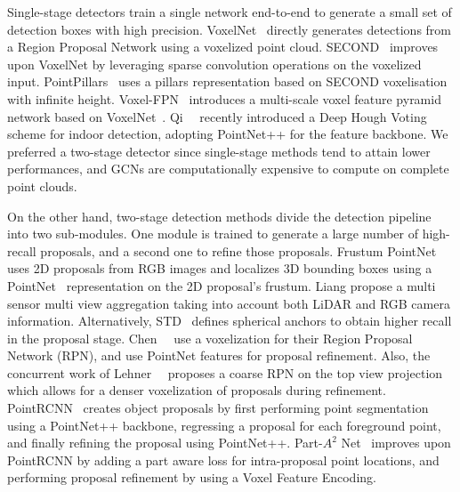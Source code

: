 \documentclass[10pt,twocolumn,letterpaper]{article}
\begin{document}
Single-stage detectors train a single network end-to-end to generate a small set of detection boxes with high precision.
VoxelNet~\cite{zhou2018voxelnet} directly generates detections from a Region Proposal Network using a voxelized point cloud.
SECOND~\cite{yan2018second} improves upon VoxelNet by leveraging sparse convolution operations on the voxelized input.
PointPillars~\cite{lang2019pointpillars} uses a pillars representation based on SECOND voxelisation with infinite height.
Voxel-FPN~\cite{wang2019voxel} introduces a multi-scale voxel feature pyramid network based on VoxelNet~\cite{zhou2018voxelnet}. 
Qi~\etal~\cite{Qi_2019_ICCV} recently introduced a Deep Hough Voting scheme for indoor detection, adopting PointNet++\cite{qi2017pointnet++} for the feature backbone.
We preferred a two-stage detector since single-stage methods tend to attain lower performances, and GCNs are computationally expensive to compute on complete point clouds.






On the other hand, two-stage detection methods divide the detection pipeline into two sub-modules.
One module is trained to generate a large number of high-recall proposals, and a second one to refine those proposals.
Frustum PointNet~\cite{qi2018frustum} uses 2D proposals from RGB images and localizes 3D bounding boxes using a PointNet~\cite{qi2017pointnet} representation on the 2D proposal's frustum.
Liang \cite{liang2019multi} propose a multi sensor multi view aggregation taking into account both LiDAR and RGB camera information.
Alternatively, STD~\cite{Yang2019std} defines spherical anchors to obtain higher recall in the proposal stage.
Chen~\etal~\cite{Chen2019FastPointRCNN} use a voxelization for their Region Proposal Network (RPN), and use PointNet features for proposal refinement.
Also, the concurrent work of Lehner~\etal~\cite{lehner2019patch} proposes a coarse RPN on the top view projection which allows for a denser voxelization of proposals during refinement.
PointRCNN~\cite{shi2019pointrcnn} creates object proposals by first performing point segmentation using a PointNet++ backbone, regressing a proposal for each foreground point, and finally refining the proposal using PointNet++. 
Part-$A^2$ Net~\cite{shi2019part} improves upon PointRCNN by adding a part aware loss for intra-proposal point locations, and performing proposal refinement by using a Voxel Feature Encoding.
\end{document}
